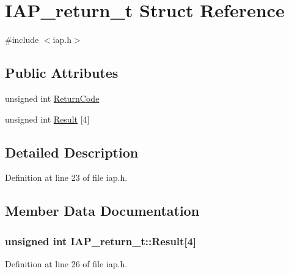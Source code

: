 \hypertarget{struct_i_a_p__return__t}{}\section{I\+A\+P\+\_\+return\+\_\+t Struct Reference}
\label{struct_i_a_p__return__t}


{\ttfamily \#include $<$iap.\+h$>$}

\subsection*{Public Attributes}
\begin{DoxyCompactItemize}
\item 
unsigned int \hyperlink{struct_i_a_p__return__t_ac0a0c8d9daad36f4fc51fa53a8f25874}{Return\+Code}
\item 
unsigned int \hyperlink{struct_i_a_p__return__t_ae285765122962c9fa695178f7cce7c29}{Result} \mbox{[}4\mbox{]}
\end{DoxyCompactItemize}


\subsection{Detailed Description}


Definition at line 23 of file iap.\+h.



\subsection{Member Data Documentation}
\subsubsection[{\texorpdfstring{Result}{Result}}]{\setlength{\rightskip}{0pt plus 5cm}unsigned int I\+A\+P\+\_\+return\+\_\+t\+::\+Result\mbox{[}4\mbox{]}}\hypertarget{struct_i_a_p__return__t_ae285765122962c9fa695178f7cce7c29}{}\label{struct_i_a_p__return__t_ae285765122962c9fa695178f7cce7c29}


Definition at line 26 of file iap.\+h.

